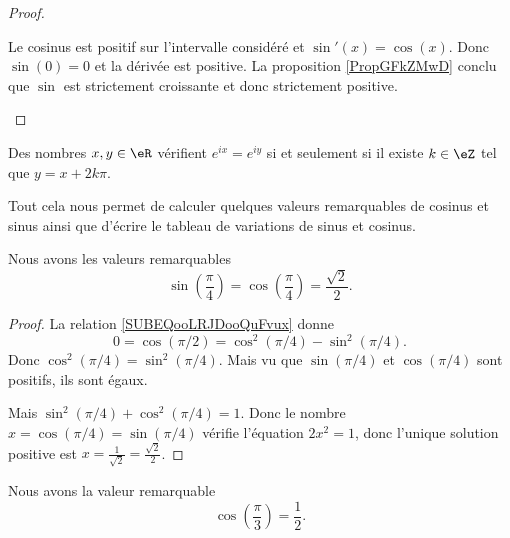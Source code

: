 \begin{proof}
\begin{enumerate}
        Le cosinus est positif sur l'intervalle considéré et \( \sin'(x)=\cos(x)\). Donc \( \sin(0)=0\) et la dérivée est positive. La proposition \ref{PropGFkZMwD} conclu que \( \sin\) est strictement croissante et donc strictement positive.
    \end{enumerate}
\end{proof}

\begin{corollary}   \label{CORooTFMAooHDRrqi}
    Des nombres \( x,y\in \eR\) vérifient \(  e^{ix}= e^{iy}\) si et seulement si il existe \( k\in\eZ\) tel que \( y=x+2k\pi\).
\end{corollary}

Tout cela nous permet de calculer quelques valeurs remarquables de cosinus et sinus ainsi que d'écrire le tableau de variations de sinus et cosinus.

\begin{lemma}       \label{LEMooIGNPooPEctJy}
    Nous avons les valeurs remarquables
    \begin{equation}
        \sin(\frac{ \pi }{ 4 })=\cos(\frac{ \pi }{ 4 })=\frac{ \sqrt{ 2 } }{2}.
    \end{equation}
\end{lemma}

\begin{proof}
    La relation \eqref{SUBEQooLRJDooQuFvux} donne
    \begin{equation}
        0=\cos(\pi/2)=\cos^2(\pi/4)-\sin^2(\pi/4).
    \end{equation}
    Donc \( \cos^2(\pi/4)=\sin^2(\pi/4)\). Mais vu que \( \sin(\pi/4)\) et \( \cos(\pi/4)\) sont positifs, ils sont égaux.

    Mais \( \sin^2(\pi/4)+\cos^2(\pi/4)=1\). Donc le nombre \( x=\cos(\pi/4)=\sin(\pi/4)\) vérifie l'équation \( 2x^2=1\), donc l'unique solution positive est \( x=\frac{1}{ \sqrt{ 2 } }=\frac{ \sqrt{ 2 } }{2}\).
\end{proof}

\begin{lemma}       \label{LEMooRMHAooDEAPMw}
    Nous avons la valeur remarquable
    \begin{equation}
        \cos(\frac{ \pi }{ 3 })=\frac{ 1 }{2}.
    \end{equation}
\end{lemma}


